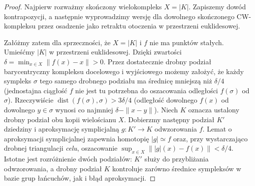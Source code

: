 \begin{proof}
Najpierw rozważmy skończony wielokompleks $X=|K|$.
Zapiszemy dowód kontrapozycji, a następnie wyprowadzimy
wersję dla dowolnego skończonego CW-kompleksu przez
osadzenie jako retraktu otoczenia w przestrzeni euklidesowej.

Załóżmy zatem dla sprzeczności, że $X=|K|$ i $f$
nie ma punktów stałych. Umieśćmy $|K|$ w przestrzeni
euklidesowej. Dzięki zwartości
$\delta=\min_{x\in X}\|f(x)-x\|>0$.
Przez dostatecznie drobny podział barycentryczny
kompleksu docelowego i wyjściowego możemy założyć,
że każdy sympleks $\sigma$ tego samego drobnego podziału
ma średnicę mniejszą niż $\delta/4$ (jednostajna
ciągłość $f$ nie jest tu potrzebna do oszacowania odległości
$f(\sigma)$ od $\sigma$). Rzeczywiście
$\operatorname{dist}(f(\sigma),\sigma)>3\delta/4$
(odległość dowolnego $f(x)$ od dowolnego $y\in\sigma$
wynosi co najmniej $\delta-\|x-y\|$).
Niech $K$ oznacza ustalony drobny podział obu kopii
wielościanu $X$. Dobierzmy następny podział $K'$ dziedziny
i aproksymację symplicjalną $g:K'\to K$ odwzorowania $f$.
Lemat o aproksymacji symplicjalnej zapewnia homotopię
$|g|\simeq f$ oraz, przy wystarczająco drobnej triangulacji
\emph{celu}, oszacowanie
$\sup_{x\in X}\||g|(x)-f(x)\|<\delta/4$.
Istotne jest rozróżnienie dwóch podziałów: $K'$ służy
do przybliżania odwzorowania, a drobny podział $K$ kontroluje
zarówno średnice sympleksów w bazie grup łańcuchów,
jak i błąd aproksymacji.


\end{proof}
